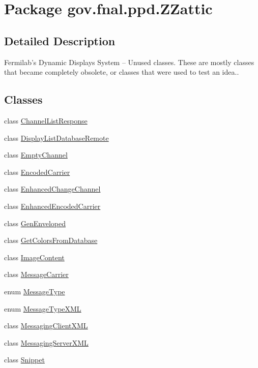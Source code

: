 \hypertarget{namespacegov_1_1fnal_1_1ppd_1_1ZZattic}{\section{Package gov.\-fnal.\-ppd.\-Z\-Zattic}
\label{namespacegov_1_1fnal_1_1ppd_1_1ZZattic}
}


\subsection{Detailed Description}
Fermilab's Dynamic Displays System -- Unused classes. These are mostly classes that became completely obsolete, or classes that were used to test an idea.. \subsection*{Classes}
\begin{DoxyCompactItemize}
\item 
class \hyperlink{classgov_1_1fnal_1_1ppd_1_1ZZattic_1_1ChannelListResponse}{Channel\-List\-Response}
\item 
class \hyperlink{classgov_1_1fnal_1_1ppd_1_1ZZattic_1_1DisplayListDatabaseRemote}{Display\-List\-Database\-Remote}
\item 
class \hyperlink{classgov_1_1fnal_1_1ppd_1_1ZZattic_1_1EmptyChannel}{Empty\-Channel}
\item 
class \hyperlink{classgov_1_1fnal_1_1ppd_1_1ZZattic_1_1EncodedCarrier}{Encoded\-Carrier}
\item 
class \hyperlink{classgov_1_1fnal_1_1ppd_1_1ZZattic_1_1EnhancedChangeChannel}{Enhanced\-Change\-Channel}
\item 
class \hyperlink{classgov_1_1fnal_1_1ppd_1_1ZZattic_1_1EnhancedEncodedCarrier}{Enhanced\-Encoded\-Carrier}
\item 
class \hyperlink{classgov_1_1fnal_1_1ppd_1_1ZZattic_1_1GenEnveloped}{Gen\-Enveloped}
\item 
class \hyperlink{classgov_1_1fnal_1_1ppd_1_1ZZattic_1_1GetColorsFromDatabase}{Get\-Colors\-From\-Database}
\item 
class \hyperlink{classgov_1_1fnal_1_1ppd_1_1ZZattic_1_1ImageContent}{Image\-Content}
\item 
class \hyperlink{classgov_1_1fnal_1_1ppd_1_1ZZattic_1_1MessageCarrier}{Message\-Carrier}
\item 
enum \hyperlink{enumgov_1_1fnal_1_1ppd_1_1ZZattic_1_1MessageType}{Message\-Type}
\item 
enum \hyperlink{enumgov_1_1fnal_1_1ppd_1_1ZZattic_1_1MessageTypeXML}{Message\-Type\-X\-M\-L}
\item 
class \hyperlink{classgov_1_1fnal_1_1ppd_1_1ZZattic_1_1MessagingClientXML}{Messaging\-Client\-X\-M\-L}
\item 
class \hyperlink{classgov_1_1fnal_1_1ppd_1_1ZZattic_1_1MessagingServerXML}{Messaging\-Server\-X\-M\-L}
\item 
class \hyperlink{classgov_1_1fnal_1_1ppd_1_1ZZattic_1_1Snippet}{Snippet}
\end{DoxyCompactItemize}
